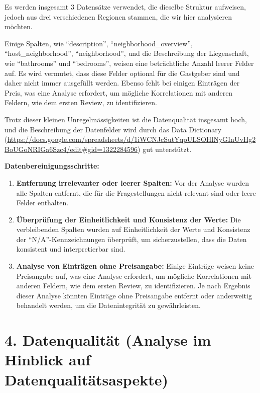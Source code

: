 \documentclass[
  journal,
]{IEEEtran}%
\begin{document}
Es werden insgesamt 3 Datensätze verwendet, die dieselbe Struktur
aufweisen, jedoch aus drei verschiedenen Regionen stammen, die wir hier
analysieren möchten.

Einige Spalten, wie ``description'', ``neighborhood\_overview'',
``host\_neighborhood'', ``neighborhood'', und die Beschreibung der
Liegenschaft, wie ``bathrooms'' und ``bedrooms'', weisen eine
beträchtliche Anzahl leerer Felder auf. Es wird vermutet, dass diese
Felder optional für die Gastgeber sind und daher nicht immer ausgefüllt
werden. Ebenso fehlt bei einigen Einträgen der Preis, was eine Analyse
erfordert, um mögliche Korrelationen mit anderen Feldern, wie dem ersten
Review, zu identifizieren.

Trotz dieser kleinen Unregelmässigkeiten ist die Datenqualität insgesamt
hoch, und die Beschreibung der Datenfelder wird durch das Data
Dictionary
(\url{https://docs.google.com/spreadsheets/d/1iWCNJcSutYqpULSQHlNyGInUvHg2BoUGoNRIGa6Szc4/edit\#gid=1322284596})
gut unterstützt.

\textbf{Datenbereinigungsschritte:}

\begin{enumerate}
\def\labelenumi{\arabic{enumi}.}
\item
  \textbf{Entfernung irrelevanter oder leerer Spalten:} Vor der Analyse
  wurden alle Spalten entfernt, die für die Fragestellungen nicht
  relevant sind oder leere Felder enthalten.
\item
  \textbf{Überprüfung der Einheitlichkeit und Konsistenz der Werte:} Die
  verbleibenden Spalten wurden auf Einheitlichkeit der Werte und
  Konsistenz der ``N/A''-Kennzeichnungen überprüft, um sicherzustellen,
  dass die Daten konsistent und interpretierbar sind.
\item
  \textbf{Analyse von Einträgen ohne Preisangabe:} Einige Einträge
  weisen keine Preisangabe auf, was eine Analyse erfordert, um mögliche
  Korrelationen mit anderen Feldern, wie dem ersten Review, zu
  identifizieren. Je nach Ergebnis dieser Analyse könnten Einträge ohne
  Preisangabe entfernt oder anderweitig behandelt werden, um die
  Datenintegrität zu gewährleisten.
\end{enumerate}

\hypertarget{datenqualituxe4t-analyse-im-hinblick-auf-datenqualituxe4tsaspekte}{%
\section{4. Datenqualität (Analyse im Hinblick auf
Datenqualitätsaspekte)}\label{datenqualituxe4t-analyse-im-hinblick-auf-datenqualituxe4tsaspekte}}
\end{document}
